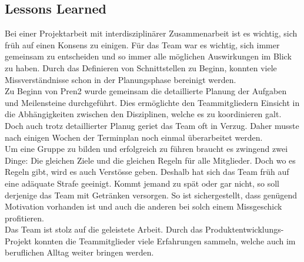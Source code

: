 \subsection{Lessons Learned}
Bei einer Projektarbeit mit interdisziplinärer Zusammenarbeit ist es wichtig, sich früh auf einen Konsens zu einigen.
Für das Team war es wichtig, sich immer gemeinsam zu entscheiden und so immer alle möglichen Auswirkungen im Blick zu haben.
Durch das Definieren von Schnittstellen zu Beginn, konnten viele Missverständnisse schon in der Planungsphase bereinigt werden.
\\[0.2cm]
Zu Beginn von Pren2 wurde gemeinsam die detaillierte Planung der Aufgaben und Meilensteine durchgeführt. Dies ermöglichte den Teammitgliedern Einsicht in die Abhängigkeiten zwischen den Disziplinen, welche es zu koordinieren galt. Doch auch trotz detaillierter Planug geriet das Team oft in Verzug. Daher musste nach einigen Wochen der Terminplan noch einmal überarbeitet werden.
\\[0.2cm]
Um eine Gruppe zu bilden und erfolgreich zu führen braucht es zwingend zwei Dinge:
Die gleichen Ziele und die gleichen Regeln für alle Mitglieder.
Doch wo es Regeln gibt, wird es auch Verstösse geben. Deshalb hat sich das Team früh auf eine adäquate Strafe geeinigt.
Kommt jemand zu spät oder gar nicht, so soll derjenige das Team mit Getränken versorgen.
So ist sichergestellt, dass genügend Motivation vorhanden ist und auch die anderen bei solch einem Missgeschick profitieren.
\\[0.2]
Das Team ist stolz auf die geleistete Arbeit. Durch das Produktentwicklungs-Projekt konnten die Teammitglieder viele Erfahrungen sammeln, welche auch im beruflichen Alltag weiter bringen werden.